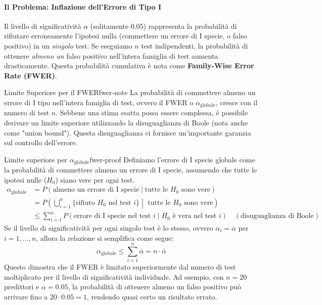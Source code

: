 \paragraph{Il Problema: Inflazione dell'Errore di Tipo I}
Il livello di significatività \(\alpha\) (solitamente 0.05) rappresenta la
probabilità di rifiutare erroneamente l'ipotesi nulla (commettere un errore di
I specie, o falso positivo) in un \textit{singolo} test. Se eseguiamo \(n\) test
indipendenti, la probabilità di ottenere \textit{almeno un} falso positivo
nell'intera famiglia di test aumenta drasticamente. Questa probabilità
cumulativa è nota come \textbf{Family-Wise Error Rate (FWER)}.

\begin{nota}{Limite Superiore per il FWER}{fwer-note}
	La probabilità di commettere almeno un errore di I tipo nell'intera
	famiglia di test, ovvero il FWER o \(\alpha_{\text{globale}}\), cresce con
	il numero di test \(n\). Sebbene una stima esatta possa essere complessa, è
	possibile derivare un limite superiore utilizzando la disuguaglianza di
	Boole (nota anche come "union bound"). Questa disuguaglianza ci fornisce
	un'importante garanzia sul controllo dell'errore.
\end{nota}

\begin{dimostrazione}{Limite superiore per
		\(\alpha_{\text{globale}}\)}{fwer-proof}
	Definiamo l'errore di I specie globale come la probabilità di commettere
	almeno un errore di I specie, assumendo che tutte le ipotesi nulle (\(H_0\))
	siano vere per ogni test.
	\begin{align*}
		\alpha_{\text{globale}} & = P(\text{almeno un errore di I specie} \mid
		\text{tutte le } H_0 \text{ sono vere})                                  \\
		                        & = P\left(\bigcup_{i=1}^{n} \{\text{rifiuto }
		H_0 \text{ nel test } i\} \middle| \text{ tutte
		le } H_0 \text{ sono vere} \right)                                       \\
		                        & \leq \sum_{i=1}^{n} P(\text{errore di I specie
			nel test } i \mid H_0 \text{ è vera nel test }
		i) \quad (\text{disuguaglianza di Boole})
	\end{align*}
	Se il livello di significatività per ogni singolo test è lo stesso, ovvero
	\(\alpha_i = \bar{\alpha}\) per \(i=1, \dots, n\), allora la relazione si
	semplifica come segue:
	\[
		\alpha_{\text{globale}} \leq \sum_{i=1}^{n} \bar{\alpha} = n \cdot
		\bar{\alpha}
	\]
	Questo dimostra che il FWER è limitato superiormente dal numero di test
	moltiplicato per il livello di significatività individuale. Ad esempio, con
	\(n=20\) predittori e \(\alpha=0.05\), la probabilità di ottenere almeno un
	falso positivo può arrivare fino a \(20 \cdot 0.05 = 1\), rendendo quasi
	certo un risultato errato.
\end{dimostrazione}

